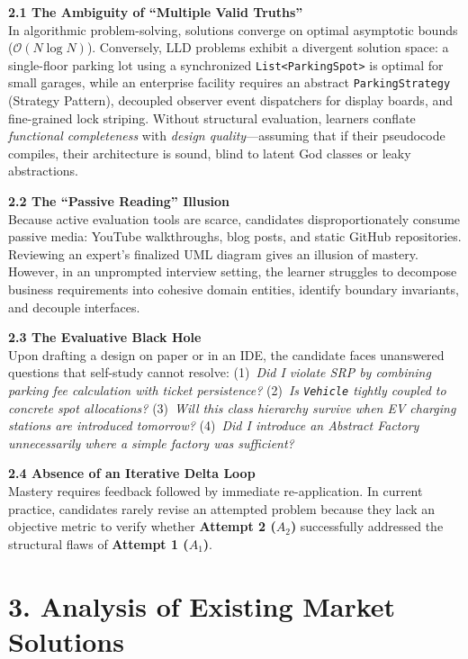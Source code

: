 \documentclass[10pt,a4paper]{article}
\begin{document}
\textbf{2.1 The Ambiguity of ``Multiple Valid Truths''} \\
In algorithmic problem-solving, solutions converge on optimal asymptotic bounds ($\mathcal{O}(N \log N)$). Conversely, LLD problems exhibit a divergent solution space: a single-floor parking lot using a synchronized \texttt{List<ParkingSpot>} is optimal for small garages, while an enterprise facility requires an abstract \texttt{ParkingStrategy} (Strategy Pattern), decoupled observer event dispatchers for display boards, and fine-grained lock striping. Without structural evaluation, learners conflate \textit{functional completeness} with \textit{design quality}---assuming that if their pseudocode compiles, their architecture is sound, blind to latent God classes or leaky abstractions.

\textbf{2.2 The ``Passive Reading'' Illusion} \\
Because active evaluation tools are scarce, candidates disproportionately consume passive media: YouTube walkthroughs, blog posts, and static GitHub repositories. Reviewing an expert's finalized UML diagram gives an illusion of mastery. However, in an unprompted interview setting, the learner struggles to decompose business requirements into cohesive domain entities, identify boundary invariants, and decouple interfaces.

\textbf{2.3 The Evaluative Black Hole} \\
Upon drafting a design on paper or in an IDE, the candidate faces unanswered questions that self-study cannot resolve:
(1)~\textit{Did I violate SRP by combining parking fee calculation with ticket persistence?}
(2)~\textit{Is \texttt{Vehicle} tightly coupled to concrete spot allocations?}
(3)~\textit{Will this class hierarchy survive when EV charging stations are introduced tomorrow?}
(4)~\textit{Did I introduce an Abstract Factory unnecessarily where a simple factory was sufficient?}

\textbf{2.4 Absence of an Iterative Delta Loop} \\
Mastery requires feedback followed by immediate re-application. In current practice, candidates rarely revise an attempted problem because they lack an objective metric to verify whether \textbf{Attempt 2 ($A_2$)} successfully addressed the structural flaws of \textbf{Attempt 1 ($A_1$)}.

\section{3. Analysis of Existing Market Solutions}
\end{document}
